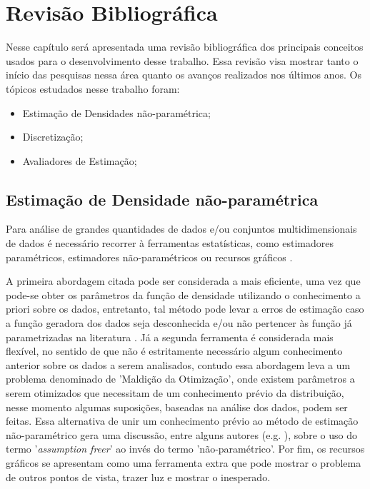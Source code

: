 \chapter{Revisão Bibliográfica}\label{cap:rev}

Nesse capítulo será apresentada uma revisão bibliográfica dos principais conceitos usados para o desenvolvimento desse trabalho. Essa revisão visa mostrar tanto o início das pesquisas nessa área quanto os avanços realizados nos últimos anos. Os tópicos estudados nesse trabalho foram:

\begin{itemize}
	\item Estimação de Densidades não-paramétrica;
	\item Discretização;
	\item Avaliadores de Estimação;
\end{itemize}

\section{Estimação de Densidade não-paramétrica}

Para análise de grandes quantidades de dados e/ou conjuntos multidimensionais de dados é necessário recorrer à ferramentas estatísticas, como estimadores paramétricos, estimadores não-paramétricos ou recursos gráficos \cite{scott2015multivariate}. 

A primeira abordagem citada pode ser considerada a mais eficiente, uma vez que pode-se obter os parâmetros da função de densidade utilizando o conhecimento a priori sobre os dados, entretanto, tal método pode levar a erros de estimação caso a função geradora dos dados seja desconhecida e/ou não pertencer às função já parametrizadas na literatura \cite{sheskin2003handbook}. Já a segunda ferramenta é considerada mais flexível, no sentido de que não é estritamente necessário algum conhecimento anterior sobre os dados a serem analisados, contudo essa abordagem leva a um problema denominado de 'Maldição da Otimização', onde existem parâmetros a serem otimizados que necessitam de um conhecimento prévio da distribuição, nesse momento algumas suposições, baseadas na análise dos dados, podem ser feitas. Essa alternativa de unir um conhecimento prévio ao método de estimação não-paramétrico gera uma discussão, entre alguns autores (e.g.  \cite{marascuilo1977nonparametric}), sobre o uso do termo '\textit{assumption freer}' ao invés do termo 'não-paramétrico'. Por fim, os recursos gráficos se apresentam como uma ferramenta extra que pode mostrar o problema de outros pontos de vista, trazer luz e mostrar o inesperado.

